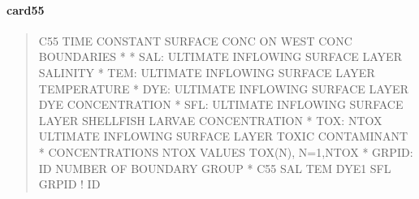 \documentclass[letterpaper,10pt,english]{sphinxmanual}
\begin{document}
\paragraph{card55}
\label{\detokenize{inputfiles/runcontrol/card55:card55}}\label{\detokenize{inputfiles/runcontrol/card55::doc}}\begin{quote}

\begin{sphinxVerbatim}[commandchars=\\\{\}]
\PYGZhy{}\PYGZhy{}\PYGZhy{}\PYGZhy{}\PYGZhy{}\PYGZhy{}\PYGZhy{}\PYGZhy{}\PYGZhy{}\PYGZhy{}\PYGZhy{}\PYGZhy{}\PYGZhy{}\PYGZhy{}\PYGZhy{}\PYGZhy{}\PYGZhy{}\PYGZhy{}\PYGZhy{}\PYGZhy{}\PYGZhy{}\PYGZhy{}\PYGZhy{}\PYGZhy{}\PYGZhy{}\PYGZhy{}\PYGZhy{}\PYGZhy{}\PYGZhy{}\PYGZhy{}\PYGZhy{}\PYGZhy{}\PYGZhy{}\PYGZhy{}\PYGZhy{}\PYGZhy{}\PYGZhy{}\PYGZhy{}\PYGZhy{}\PYGZhy{}\PYGZhy{}\PYGZhy{}\PYGZhy{}\PYGZhy{}\PYGZhy{}\PYGZhy{}\PYGZhy{}\PYGZhy{}\PYGZhy{}\PYGZhy{}\PYGZhy{}\PYGZhy{}\PYGZhy{}\PYGZhy{}\PYGZhy{}\PYGZhy{}\PYGZhy{}\PYGZhy{}\PYGZhy{}\PYGZhy{}\PYGZhy{}\PYGZhy{}\PYGZhy{}\PYGZhy{}\PYGZhy{}\PYGZhy{}\PYGZhy{}\PYGZhy{}\PYGZhy{}\PYGZhy{}\PYGZhy{}\PYGZhy{}\PYGZhy{}\PYGZhy{}\PYGZhy{}\PYGZhy{}\PYGZhy{}\PYGZhy{}
C55 TIME CONSTANT SURFACE CONC ON WEST CONC BOUNDARIES
*
*    SAL: ULTIMATE INFLOWING SURFACE LAYER SALINITY
*    TEM: ULTIMATE INFLOWING SURFACE LAYER TEMPERATURE
*    DYE: ULTIMATE INFLOWING SURFACE LAYER DYE CONCENTRATION
*    SFL: ULTIMATE INFLOWING SURFACE LAYER SHELLFISH LARVAE CONCENTRATION
*    TOX: NTOX ULTIMATE INFLOWING SURFACE LAYER TOXIC CONTAMINANT
*         CONCENTRATIONS NTOX VALUES TOX(N), N=1,NTOX
*  GRPID: ID NUMBER OF BOUNDARY GROUP
*
C55       SAL       TEM      DYE1       SFL      GRPID ! ID
\end{sphinxVerbatim}
\end{quote}
\end{document}
